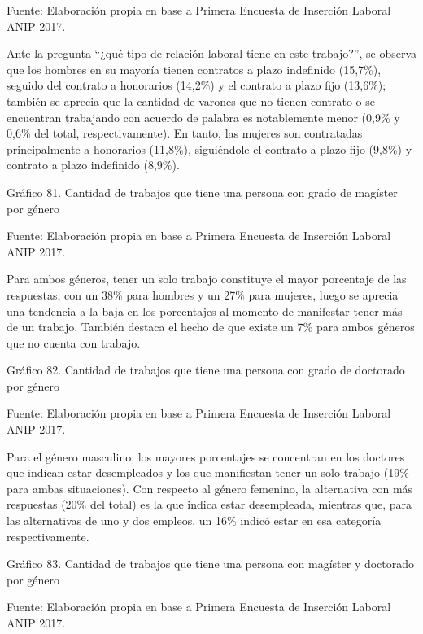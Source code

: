 \documentclass{article}
\begin{document}
Fuente: Elaboración propia en base a Primera Encuesta de Inserción Laboral ANIP 2017.

Ante la pregunta “¿qué tipo de relación laboral tiene en este trabajo?”, se observa que los hombres en su mayoría tienen contratos a plazo indefinido (15,7\%), seguido del contrato a honorarios (14,2\%) y el contrato a plazo fijo (13,6\%); también se aprecia que la cantidad de varones que no tienen contrato o se encuentran trabajando con acuerdo de palabra es notablemente menor (0,9\% y 0,6\% del total, respectivamente). En tanto, las mujeres son contratadas principalmente a honorarios (11,8\%), siguiéndole el contrato a plazo fijo (9,8\%) y contrato a plazo indefinido (8,9\%).

Gráfico 81. Cantidad de trabajos que tiene una persona con grado de magíster por género


Fuente: Elaboración propia en base a Primera Encuesta de Inserción Laboral ANIP 2017.

Para ambos géneros, tener un solo trabajo constituye el mayor porcentaje de las respuestas, con un 38\% para hombres y un 27\% para mujeres, luego se aprecia una tendencia a la baja en los porcentajes al momento de manifestar tener más de un trabajo. También destaca el hecho de que existe un 7\% para ambos géneros que no cuenta con trabajo.

Gráfico 82. Cantidad de trabajos que tiene una persona con grado de doctorado por género


Fuente: Elaboración propia en base a Primera Encuesta de Inserción Laboral ANIP 2017.

Para el género masculino, los mayores porcentajes se concentran en los doctores que indican estar desempleados y los que manifiestan tener un solo trabajo (19\% para ambas situaciones). Con respecto al género femenino, la alternativa con más respuestas (20\% del total) es la que indica estar desempleada, mientras que, para las alternativas de uno y dos empleos, un 16\% indicó estar en esa categoría respectivamente.

Gráfico 83. Cantidad de trabajos que tiene una persona con magíster y doctorado por género


Fuente: Elaboración propia en base a Primera Encuesta de Inserción Laboral ANIP 2017.
\end{document}
